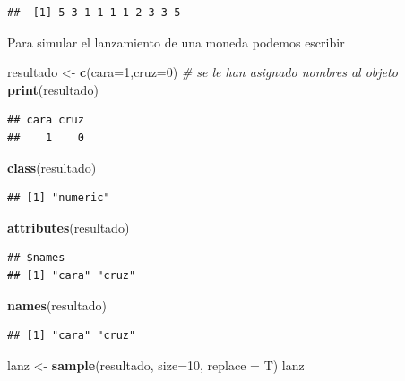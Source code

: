 \documentclass[]{book}
\newenvironment{Shaded}{\begin{snugshade}}{\end{snugshade}}
\newcommand{\KeywordTok}[1]{\textcolor[rgb]{0.13,0.29,0.53}{\textbf{#1}}}
\newcommand{\DataTypeTok}[1]{\textcolor[rgb]{0.13,0.29,0.53}{#1}}
\newcommand{\DecValTok}[1]{\textcolor[rgb]{0.00,0.00,0.81}{#1}}
\newcommand{\StringTok}[1]{\textcolor[rgb]{0.31,0.60,0.02}{#1}}
\newcommand{\CommentTok}[1]{\textcolor[rgb]{0.56,0.35,0.01}{\textit{#1}}}
\newcommand{\NormalTok}[1]{#1}
\begin{document}
\begin{verbatim}
##  [1] 5 3 1 1 1 1 2 3 3 5
\end{verbatim}

Para simular el lanzamiento de una moneda podemos escribir

\begin{Shaded}
\begin{Highlighting}[]
\NormalTok{resultado <-}\StringTok{ }\KeywordTok{c}\NormalTok{(}\DataTypeTok{cara=}\DecValTok{1}\NormalTok{,}\DataTypeTok{cruz=}\DecValTok{0}\NormalTok{) }\CommentTok{# se le han asignado nombres al objeto}
\KeywordTok{print}\NormalTok{(resultado)}
\end{Highlighting}
\end{Shaded}

\begin{verbatim}
## cara cruz 
##    1    0
\end{verbatim}

\begin{Shaded}
\begin{Highlighting}[]
\KeywordTok{class}\NormalTok{(resultado)}
\end{Highlighting}
\end{Shaded}

\begin{verbatim}
## [1] "numeric"
\end{verbatim}

\begin{Shaded}
\begin{Highlighting}[]
\KeywordTok{attributes}\NormalTok{(resultado)}
\end{Highlighting}
\end{Shaded}

\begin{verbatim}
## $names
## [1] "cara" "cruz"
\end{verbatim}

\begin{Shaded}
\begin{Highlighting}[]
\KeywordTok{names}\NormalTok{(resultado)}
\end{Highlighting}
\end{Shaded}

\begin{verbatim}
## [1] "cara" "cruz"
\end{verbatim}

\begin{Shaded}
\begin{Highlighting}[]
\NormalTok{lanz <-}\StringTok{ }\KeywordTok{sample}\NormalTok{(resultado, }\DataTypeTok{size=}\DecValTok{10}\NormalTok{, }\DataTypeTok{replace =}\NormalTok{ T)}
\NormalTok{lanz}
\end{Highlighting}
\end{Shaded}
\end{document}
